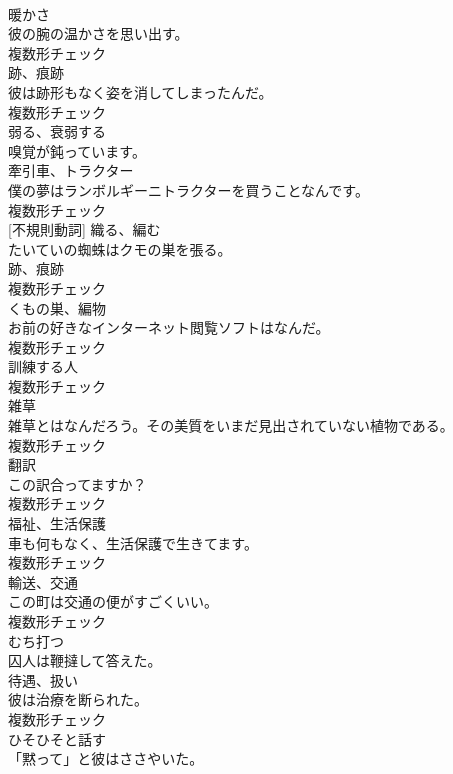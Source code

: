 \documentclass[8pt]{extreport}
\begin{document}
\begin{CJK}{UTF8}{min}
\\	[名詞]	暖かさ	
\\	彼の腕の温かさを思い出す。	
\\	複数形チェック
\\	[名詞]	跡、痕跡	
\\	彼は跡形もなく姿を消してしまったんだ。	
\\	複数形チェック
\\	[動詞]	弱る、衰弱する	
\\	嗅覚が鈍っています。	
\\	[名詞]	牽引車、トラクター	
\\	僕の夢はランボルギーニトラクターを買うことなんです。	
\\	複数形チェック
\\	[動詞] [不規則動詞]	織る、編む	
\\	たいていの蜘蛛はクモの巣を張る。	
\\	[名詞]	跡、痕跡	
\\	複数形チェック
\\	[名詞]	くもの巣、編物	
\\	お前の好きなインターネット閲覧ソフトはなんだ。	
\\	複数形チェック
\\	[名詞]	訓練する人	
\\	複数形チェック
\\	[名詞]	雑草	
\\	雑草とはなんだろう。その美質をいまだ見出されていない植物である。	
\\	複数形チェック
\\	[名詞]	翻訳	
\\	この訳合ってますか？	
\\	複数形チェック
\\	[名詞]	福祉、生活保護	
\\	車も何もなく、生活保護で生きてます。	
\\	複数形チェック
\\	[名詞]	輸送、交通	
\\	この町は交通の便がすごくいい。	
\\	複数形チェック
\\	[動詞]	むち打つ	
\\	囚人は鞭撻して答えた。	
\\	[名詞]	待遇、扱い	
\\	彼は治療を断られた。	
\\	複数形チェック
\\	[動詞]	ひそひそと話す	
\\	「黙って」と彼はささやいた。	

\end{CJK}
\end{document}

